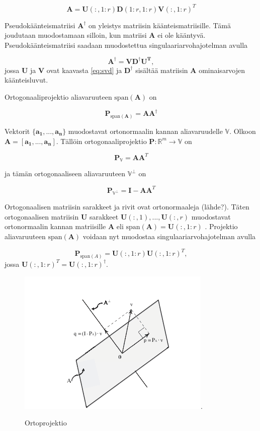 \begin{equation}
    \mathbf{A} = \mathbf{U}(:,1:r)\mathbf{D}(1:r,1:r)\mathbf{V}(:,1:r)^T
    \label{eq:2}
\end{equation}


Pseudokäänteismatriisi $\mathbf{A^{\dagger}}$ on yleistys matriisin käänteismatriisille. Tämä joudutaan muodostamaan silloin, kun matriisi $\mathbf{A}$ ei ole kääntyvä. Pseudokäänteismatriisi saadaan muodostettua singulaariarvohajotelman avulla

\begin{equation}
    \mathbf{A^{\dagger} = VD^{\dagger}U^T},
\end{equation}
jossa \textbf{U} ja \textbf{V} ovat kaavasta \ref{eq:svd} ja $\mathbf{D}^{\dagger}$ sisältää matriisin \textbf{A} ominaisarvojen käänteisluvut.

Ortogonaaliprojektio aliavaruuteen $\text{span}(\mathbf{A})$ on 

\begin{equation}
    \mathbf{P}_{\text{span}(\mathbf{A})}= \mathbf{AA}^{\dagger}
\end{equation}

Vektorit $\{\mathbf{a_1,...,a_n}\}$ muodostavat ortonormaalin kannan aliavaruudelle $\mathbb{V}$. Olkoon $\mathbf{A = [\mathbf{a_1,...,a_n}]}$. Tällöin ortogonaaliprojektio $\mathbf{P}: \mathbb{R}^m \to \mathbb{V}$ on

\begin{equation}
    \mathbf{P}_{\mathbb{V}} = \mathbf{AA}^T
\end{equation}

ja tämän ortogonaaliseen aliavaruuteen $\mathbb{V}^{\bot}$ on

\begin{equation}
    \mathbf{P}_{\mathbb{V}^{\bot}}=\mathbf{I}-\mathbf{AA}^T
\end{equation}

Ortogonaalisen matriisin sarakkeet ja rivit ovat ortonormaaleja (lähde?). Täten ortogonaalisen matriisin \textbf{U} sarakkeet $\mathbf{U}(:,1),...,\mathbf{U}(:,r)$ muodostavat ortonormaalin kannan matriisille \textbf{A} eli $\text{span}(\mathbf{A}) = \mathbf{U}(:,1:r)$ \citep{Uusitalo1997Signal-spaceComponents}. Projektio aliavaruuteen $\text{span}(\mathbf{A})$ voidaan nyt muodostaa singulaariarvohajotelman avulla

\begin{equation}
    \mathbf{P}_{\text{span}(A)} = \mathbf{U}(:,1:r)\mathbf{U}(:,1:r)^T,
    \label{eq:6}
\end{equation}
jossa $\mathbf{U}(:,1:r)^T = \mathbf{U}(:,1:r)^{\dagger}$.

\begin{figure}[h]
    \centering
    \includegraphics[width=.7\textwidth]{ortoprojektio.png}.
    \caption{Ortoprojektio}
\end{figure}